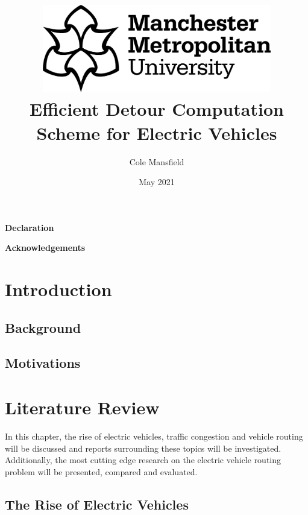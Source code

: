 \documentclass[11pt]{report}
\title{\includegraphics[width=10cm]{mmuLogo.png}\\Efficient Detour Computation Scheme for Electric Vehicles}
\author{Cole Mansfield}
\date{May 2021}
\begin{document}
\begin{titlepage}
\maketitle
\end{titlepage}


\begin{center}
  \normalsize\textbf{Declaration}
\end{center}
\newpage

\begin{center}
  \normalsize\textbf{Acknowledgements}
\end{center}
\newpage

\begin{abstract}
\end{abstract}
\newpage

\tableofcontents
\newpage

\glsaddall
\printglossary[type=\acronymtype]
\newpage

\chapter{Introduction}

\newpage

\section{Background}

\section{Motivations}

\newpage

\chapter{Literature Review}

\newpage

\noindent In this chapter, the rise of electric vehicles, traffic congestion and vehicle routing will be discussed and reports surrounding these topics will be investigated. Additionally, the most cutting edge research on the electric vehicle routing problem will be presented, compared and evaluated.

\section{The Rise of Electric Vehicles}
\end{document}
